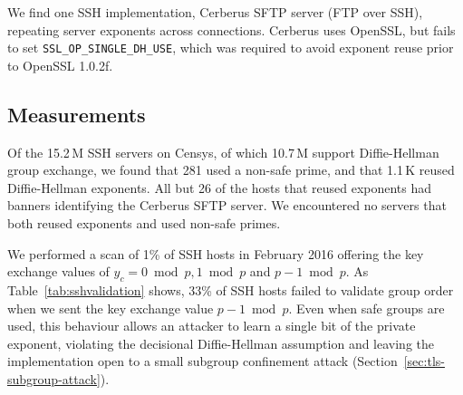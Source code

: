 We find one SSH implementation, Cerberus SFTP server (FTP over SSH), repeating server exponents across connections. 
Cerberus uses OpenSSL, but fails to set \texttt{SSL\_OP\_SINGLE\-\_DH\_USE}, which was required
to avoid exponent reuse prior to OpenSSL 1.0.2f.

\subsection{Measurements}

Of the 15.2\,M SSH servers on Censys, of which 10.7\,M support Diffie-Hellman
group exchange, we found that 281 used a non-safe prime, and that
1.1\,K reused Diffie-Hellman exponents. All but 26 of the hosts that reused exponents had banners identifying the Cerberus SFTP server. We
encountered no servers that both reused exponents and used non-safe primes.

We performed a scan of 1\% of SSH hosts in February 2016 offering the key
exchange values of $y_c = 0 \bmod p, 1 \bmod p$ and $p-1 \bmod p$. As
Table~\ref{tab:sshvalidation} shows, 33\% of SSH hosts failed to validate group
order when we sent the key exchange value $p-1 \bmod p$. Even when safe groups
are used, this behaviour allows an attacker to learn a single bit of the
private exponent, violating the decisional Diffie-Hellman assumption and
leaving the implementation open to a small subgroup confinement attack
(Section~\ref{sec:tls-subgroup-attack}).

